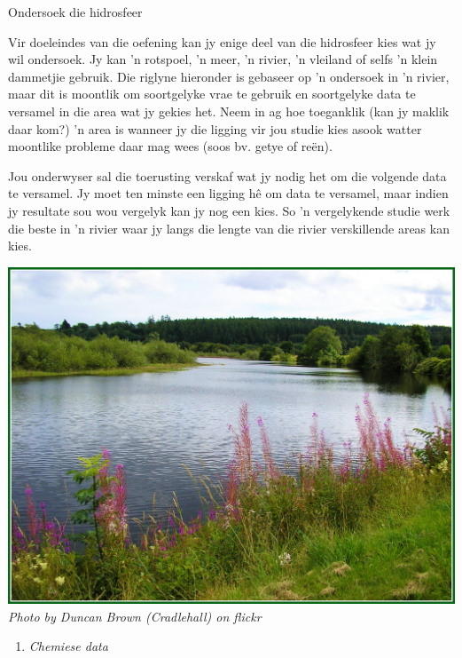             \begin{Investigation}{Ondersoek die hidrosfeer }
            \nopagebreak 
\begin{minipage}{.5\textwidth}
            \label{m38138*uid4}
Vir doeleindes van die oefening kan jy enige deel van die hidrosfeer kies wat jy wil ondersoek. Jy kan   'n rotspoel,   'n meer,   'n rivier,   'n vleiland of selfs   'n klein dammetjie gebruik. Die riglyne hieronder is gebaseer op   'n ondersoek in   'n rivier, maar dit is moontlik om soortgelyke vrae te gebruik en soortgelyke data te versamel in die area wat jy gekies het. Neem in ag hoe toeganklik (kan jy maklik daar kom?)   'n area is wanneer jy die ligging vir jou studie kies asook watter moontlike probleme daar mag wees (soos bv. getye of re\"{e}n).\par
\label{m38138*uid5}
Jou onderwyser sal die toerusting verskaf wat jy nodig het om die volgende data te versamel. Jy moet ten minste een ligging h\^{e} om data te versamel, maar indien jy resultate sou wou vergelyk kan jy nog een kies. So   'n vergelykende studie werk die beste in   'n rivier waar jy langs die lengte van die rivier verskillende areas kan kies. \par
\end{minipage}
\begin{minipage}{.5\textwidth}
\begin{center}
 \includegraphics[width=.8\textwidth]{photos/DuncanBrown(Cradlehall).jpg} \\
\textsl{Photo by Duncan Brown (Cradlehall) on flickr}
\end{center}
\end{minipage}
\label{m38138*id334646}\begin{enumerate}[noitemsep, label=\textbf{\arabic*}. ] 
            \label{m38138*uid6}\item \textsl{Chemiese data}

\end{enumerate}
\end{Investigation}
